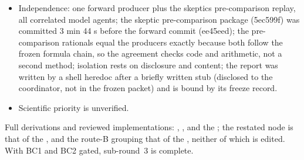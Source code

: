 \begin{gatequote}
\begin{itemize}
fixed point, the AX1 route-B grouping, finite-volume theorem, state lemma,
flip identity and route-B AQ1/AQ2 re-instantiation list, AV1 F20-F23, the AX2
certificate and calculator, and the I1 dictionary; the analytic disc (BA1
reverse Theorem 4.1), the iterated split (BB1 reverse) and the whole-sequence
scheme (BB2) are shared premises named by the contract. The producer read
parts of the gated BB1 reverse check.py outside its inputs for conventions
(disclosed); no BC2 constant depends on it.
\item Independence: one forward producer plus the skeptic\textquotesingle{}s
pre-comparison replay, all correlated model agents; the skeptic pre-comparison
package (5ec599f) was committed 3 min 44 s before the forward commit
(ee45eed); the pre-comparison rationals equal the producer\textquotesingle{}s
exactly because both follow the frozen formula chain, so the agreement checks
code and arithmetic, not a second method; isolation rests on disclosure and
content; the report was written by a shell heredoc after a briefly written
stub (disclosed to the coordinator, not in the frozen packet) and is bound by
its freeze record.
\item Scientific priority is unverified.
\end{itemize}
\end{gatequote}
Full derivations and reviewed implementations:
,
,
 and the
; the restated node
is that of the , and
the route-B grouping that of the
, neither of which is
edited. With BC1 and BC2 gated, sub-round~3 is complete.

